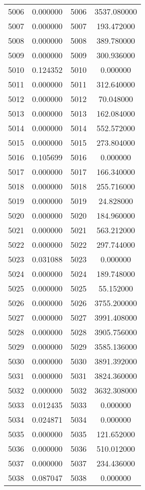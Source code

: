 \documentclass[12pt]{article}
\begin{document}
\begin{longtable}{@{}cccc@{}}
5006 & 0.000000 & 5006 & 3537.080000 \\
5007 & 0.000000 & 5007 & 193.472000 \\
5008 & 0.000000 & 5008 & 389.780000 \\
5009 & 0.000000 & 5009 & 300.936000 \\
5010 & 0.124352 & 5010 & 0.000000 \\
5011 & 0.000000 & 5011 & 312.640000 \\
5012 & 0.000000 & 5012 & 70.048000 \\
5013 & 0.000000 & 5013 & 162.084000 \\
5014 & 0.000000 & 5014 & 552.572000 \\
5015 & 0.000000 & 5015 & 273.804000 \\
5016 & 0.105699 & 5016 & 0.000000 \\
5017 & 0.000000 & 5017 & 166.340000 \\
5018 & 0.000000 & 5018 & 255.716000 \\
5019 & 0.000000 & 5019 & 24.828000 \\
5020 & 0.000000 & 5020 & 184.960000 \\
5021 & 0.000000 & 5021 & 563.212000 \\
5022 & 0.000000 & 5022 & 297.744000 \\
5023 & 0.031088 & 5023 & 0.000000 \\
5024 & 0.000000 & 5024 & 189.748000 \\
5025 & 0.000000 & 5025 & 55.152000 \\
5026 & 0.000000 & 5026 & 3755.200000 \\
5027 & 0.000000 & 5027 & 3991.408000 \\
5028 & 0.000000 & 5028 & 3905.756000 \\
5029 & 0.000000 & 5029 & 3585.136000 \\
5030 & 0.000000 & 5030 & 3891.392000 \\
5031 & 0.000000 & 5031 & 3824.360000 \\
5032 & 0.000000 & 5032 & 3632.308000 \\
5033 & 0.012435 & 5033 & 0.000000 \\
5034 & 0.024871 & 5034 & 0.000000 \\
5035 & 0.000000 & 5035 & 121.652000 \\
5036 & 0.000000 & 5036 & 510.012000 \\
5037 & 0.000000 & 5037 & 234.436000 \\
5038 & 0.087047 & 5038 & 0.000000 \\

\end{longtable}
\end{document}

